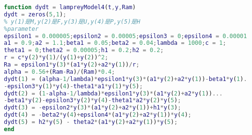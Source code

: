 \documentclass[12pt]{article}  %
\begin{document}
\begin{subappendices}
\begin{lstlisting}[language=MATLAB, name={test.m}]
% Model 3&4
function dydt = lampreyModel4(t,y,Ram)
dydt = zeros(5,1);
% y(1)是M,y(2)是F,y(3)是U,y(4)是P,y(5)是H
%parameter
epsilon1 = 0.000005;epsilon2 = 0.00005;epsilon3 = 0;epsilon4 = 0.00001;
a1 = 0.9;a2 = 1.1;beta1 = 0.05;beta2 = 0.04;lambda = 1000;c = 1;
theta1 = 0;theta2 = 0.00005;h1 = 0.2;h2 = 0.2;
r = c*y(2)*y(1)/(y(1)+y(2))^2;
Ra = epsilon1*y(3)*(a1*y(2)+a2*y(1))/r;
alpha = 0.56+(Ram-Ra)/(Ram)*0.4;
dydt(1) = (alpha-1/lambda)*epsilon1*y(3)*(a1*y(2)+a2*y(1))-beta1*y(1)...
-epsilon3*y(1)*y(4)-theta1*a1*y(1)*y(5);
dydt(2) = (1-alpha-1/lambda)*epsilon1*y(3)*(a1*y(2)+a2*y(1))...
-beta1*y(2)-epsilon3*y(2)*y(4)-theta1*a2*y(2)*y(5);
dydt(3) = -epsilon2*y(3)*(a1*y(2)+a2*y(1))+h1*y(3);
dydt(4) = -beta2*y(4)+epsilon4*(a1*y(2)+a2*y(1))*y(4);
dydt(5) = h2*y(5) - theta2*(a1*y(2)+a2*y(1))*y(5);
end

\end{lstlisting}


\newpage
\newpage
\end{subappendices}  %
\end{document}
